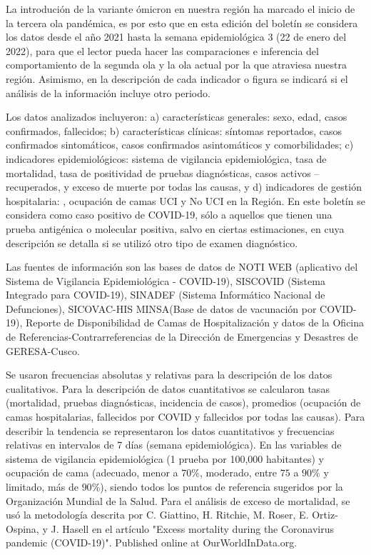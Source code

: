 \documentclass[12pt,a4paper,openany]{book}
\begin{document}
	La introdución de la variante ómicron en nuestra región ha marcado el inicio de la tercera ola pandémica, es por esto que en esta edición del boletín se considera los datos desde el año 2021 hasta la semana epidemiológica 3 (22 de enero del 2022), para que el lector pueda hacer las comparaciones e inferencia del comportamiento de la segunda ola y la ola actual por la que atraviesa nuestra región. Asimismo, en la descripción de cada indicador o figura se indicará si el análisis de la información incluye otro periodo. 
	
	Los datos analizados incluyeron: a) características generales: sexo, edad, casos confirmados, fallecidos; b) características clínicas: síntomas reportados, casos confirmados sintomáticos, casos confirmados asintomáticos y comorbilidades; c) indicadores epidemiológicos: sistema de vigilancia epidemiológica, tasa de mortalidad, tasa de positividad de pruebas diagnósticas, casos activos – recuperados, y exceso de muerte por todas las causas, y d) indicadores de gestión hospitalaria: , ocupación de camas UCI y No UCI en la Región. En este boletín se considera como caso positivo de COVID-19, sólo a aquellos que tienen una prueba antigénica o molecular positiva, salvo en ciertas estimaciones, en cuya descripción se detalla si se utilizó otro tipo de examen diagnóstico. 
	
	Las fuentes de información son las bases de datos de NOTI WEB (aplicativo del Sistema de Vigilancia Epidemiológica - COVID-19), SISCOVID (Sistema Integrado para COVID-19), SINADEF (Sistema Informático Nacional de Defunciones), SICOVAC-HIS MINSA(Base de datos de vacunación por COVID-19), Reporte de Disponibilidad de Camas de Hospitalización y datos de la Oficina de Referencias-Contrarreferencias de la Dirección de Emergencias y Desastres de GERESA-Cusco. 
	
	Se usaron frecuencias absolutas y relativas para la descripción de los datos cualitativos. Para la descripción de datos cuantitativos se calcularon tasas (mortalidad, pruebas diagnósticas, incidencia de casos), promedios (ocupación de camas hospitalarias, fallecidos por COVID y fallecidos por todas las causas). Para describir la tendencia se representaron los datos cuantitativos y frecuencias relativas en intervalos de 7 días (semana epidemiológica). En las variables de sistema de vigilancia epidemiológica (1 prueba por 100,000 habitantes) y ocupación de cama (adecuado, menor a $70\%$, moderado, entre $75$ a $90\%$ y limitado, más de $90\%$), siendo todos los puntos de referencia sugeridos por la Organización Mundial de la Salud. Para el análisis de exceso de mortalidad, se usó la metodología descrita por C. Giattino, H. Ritchie, M. Roser, E. Ortiz-Ospina, y J. Hasell en el artículo "Excess mortality during the Coronavirus pandemic (COVID-19)". Published online at OurWorldInData.org.
	
\end{document}
